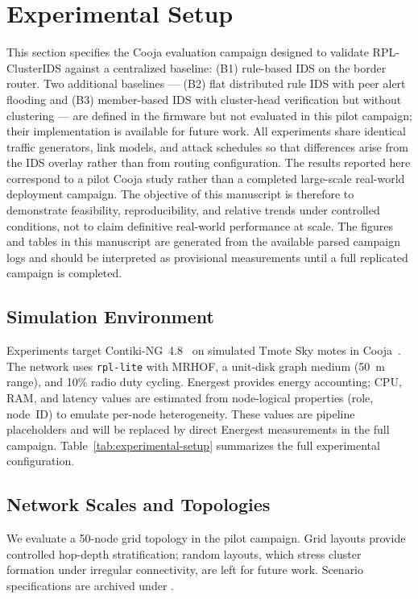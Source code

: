 \section{Experimental Setup}
\label{sec:experimental-setup}

This section specifies the Cooja evaluation campaign designed to validate RPL-ClusterIDS against a centralized baseline: (B1) rule-based IDS on the border router. Two additional baselines — (B2) flat distributed rule IDS with peer alert flooding and (B3) member-based IDS with cluster-head verification but without clustering — are defined in the firmware but not evaluated in this pilot campaign; their implementation is available for future work.
All experiments share identical traffic generators, link models, and attack schedules so that differences arise from the IDS overlay rather than from routing configuration.
The results reported here correspond to a pilot Cooja study rather than a completed large-scale real-world deployment campaign. The objective of this manuscript is therefore to demonstrate feasibility, reproducibility, and relative trends under controlled conditions, not to claim definitive real-world performance at scale. The figures and tables in this manuscript are generated from the available parsed campaign logs and should be interpreted as provisional measurements until a full replicated campaign is completed.

\subsection{Simulation Environment}
Experiments target Contiki-NG~4.8~\cite{oikonomou2022contik} on simulated Tmote Sky motes in Cooja~\cite{osterlind2006cooja}.
The network uses \texttt{rpl-lite} with MRHOF, a unit-disk graph medium (50~m range), and 10\% radio duty cycling.
Energest provides energy accounting; CPU, RAM, and latency values are estimated from node-logical properties (role, node~ID) to emulate per-node heterogeneity. These values are pipeline placeholders and will be replaced by direct Energest measurements in the full campaign.
Table~\ref{tab:experimental-setup} summarizes the full experimental configuration.



\subsection{Network Scales and Topologies}
We evaluate a 50-node grid topology in the pilot campaign. Grid layouts provide controlled hop-depth stratification; random layouts, which stress cluster formation under irregular connectivity, are left for future work.
Scenario specifications are archived under .

